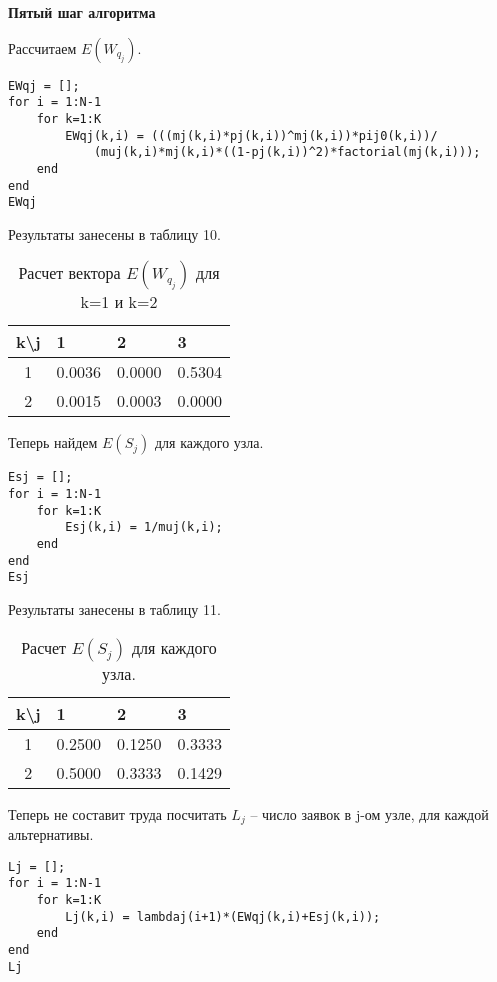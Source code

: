 \textbf{Пятый шаг алгоритма}

Рассчитаем $E(W_{q_j})$.

\begin{Verbatim}[frame=single]
% E(Wqj) для каждого узла.
EWqj = [];
for i = 1:N-1
    for k=1:K
        EWqj(k,i) = (((mj(k,i)*pj(k,i))^mj(k,i))*pij0(k,i))/
        	(muj(k,i)*mj(k,i)*((1-pj(k,i))^2)*factorial(mj(k,i)));
    end
end     
EWqj
\end{Verbatim}

Результаты занесены в таблицу 10.

\begin{table}[htb]
	\begin{tabularx}{\textwidth}{|c|X|X|X|}
	\hline 
	k\textbackslash{}j & 1 & 2 & 3 \\ 
	\hline
	1 & 0.0036 & 0.0000 & 0.5304 \\ 
	\hline 
	2 & 0.0015 & 0.0003 & 0.0000 \\ 
	\hline 
	\end{tabularx}
\caption{Расчет вектора $E(W_{q_j})$  для k=1 и k=2}
\end{table}

Теперь найдем $E(S_j)$ для каждого узла.
\begin{Verbatim}[frame=single]
% Найдем E(sj) для каждого узла.
Esj = [];
for i = 1:N-1
    for k=1:K
        Esj(k,i) = 1/muj(k,i);
    end
end  
Esj
\end{Verbatim}

Результаты занесены в таблицу 11.

\begin{table}[htb]
	\begin{tabularx}{\textwidth}{|c|X|X|X|}
	\hline 
	k\textbackslash{}j & 1 & 2 & 3 \\ 
	\hline 
	1 & 0.2500 & 0.1250 & 0.3333 \\ 
	\hline 
	2 & 0.5000 & 0.3333 & 0.1429 \\ 
	\hline 
	\end{tabularx}
\caption{Расчет $E(S_j)$ для каждого узла.}
\end{table}

Теперь не составит труда посчитать $L_j$ --  число заявок в j-ом узле, для каждой альтернативы.

\begin{Verbatim}[frame=single]
% Найдем Lj
Lj = [];
for i = 1:N-1
    for k=1:K
        Lj(k,i) = lambdaj(i+1)*(EWqj(k,i)+Esj(k,i));
    end
end
Lj
\end{Verbatim}

